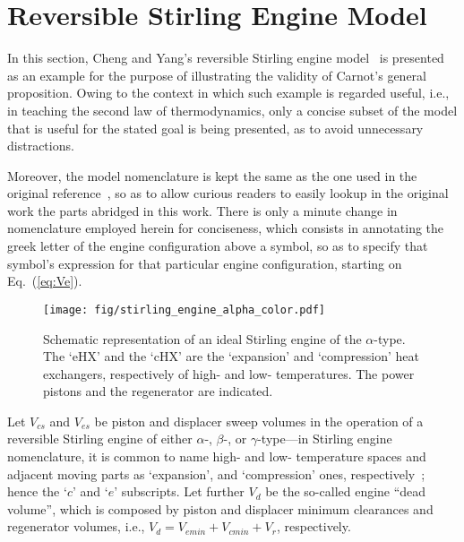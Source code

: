 \section{Reversible Stirling Engine Model}

    In     this     section,     Cheng     and     Yang's     reversible     Stirling     engine
    model~\cite{2012-ChengCH+YangHS-ApEnergy} is presented as an  example  for  the  purpose  of
    illustrating the validity of Carnot's general proposition. Owing to  the  context  in  which
    such example is regarded useful, i.e., in teaching the second law of thermodynamics, only  a
    concise subset of the model that is useful for the stated goal is  being  presented,  as  to
    avoid unnecessary distractions.

    Moreover, the model nomenclature  is  kept  the  same  as  the  one  used  in  the  original
    reference~\cite{2012-ChengCH+YangHS-ApEnergy}, so as to  allow  curious  readers  to  easily
    lookup in the original work the parts abridged in this work. There is only a  minute  change
    in nomenclature employed herein for conciseness, which  consists  in  annotating  the  greek
    letter of the engine configuration above a symbol, so as to specify that symbol's expression
    for that particular engine configuration, starting on Eq.~(\ref{eq:Ve}).

    \begin{figure}[ht]
        \centering
        \texttt{[image: fig/stirling\_engine\_alpha\_color.pdf]}
        \caption{Schematic representation of an ideal Stirling engine of the $\alpha$-type.  The
            `eHX'  and  the  `cHX'  are  the  `expansion'  and  `compression'  heat  exchangers,
            respectively of high- and low- temperatures. The power pistons and  the  regenerator
            are indicated.}
        \label{fig:alpha}
    \end{figure}

    Let $V_{cs}$ and $V_{es}$ be piston and displacer  sweep  volumes  in  the  operation  of  a
    reversible Stirling engine of either $\alpha$-,  $\beta$-,  or  $\gamma$-type---in  Stirling
    engine nomenclature, it is common to name high- and low-  temperature  spaces  and  adjacent
    moving       parts       as        `expansion',        and        `compression'        ones,
    respectively~\cite{2013-CengelYA+BolesMA-AMGH}; hence the `$c$' and  `$e$'  subscripts.  Let
    further $V_d$ be the so-called engine ``dead volume'',  which  is  composed  by  piston  and
    displacer minimum clearances and regenerator volumes, i.e., $V_d =  V_{emin}  +  V_{cmin}  +
    V_r$, respectively.

